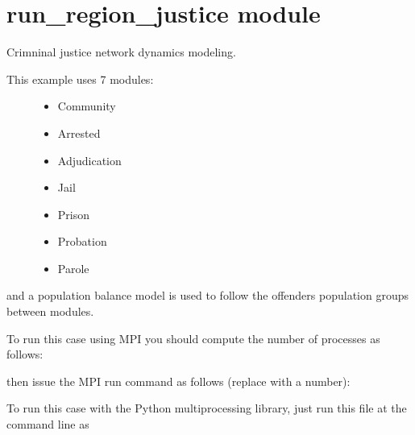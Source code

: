 \documentclass[letterpaper,10pt,openany,oneside,english]{sphinxmanual}
\begin{document}
\section{run\_region\_justice module}
\label{\detokenize{examples_rst/run_region_justice:module-run_region_justice}}\label{\detokenize{examples_rst/run_region_justice:run-region-justice-module}}\label{\detokenize{examples_rst/run_region_justice::doc}}
Crimninal justice network dynamics modeling.
\begin{description}
\item[{This example uses 7 modules:}] \leavevmode\begin{itemize}
\item {} 
Community

\item {} 
Arrested

\item {} 
Adjudication

\item {} 
Jail

\item {} 
Prison

\item {} 
Probation

\item {} 
Parole

\end{itemize}

\end{description}

and a population balance model is used to follow the offenders population
groups between modules.

To run this case using MPI you should compute the number of
processes as follows:
\begin{quote}

\end{quote}

then issue the MPI run command as follows (replace  with a number):
\begin{quote}

\end{quote}

To run this case with the Python multiprocessing library, just run this file at the
command line as
\begin{quote}

\end{quote}
\end{document}
